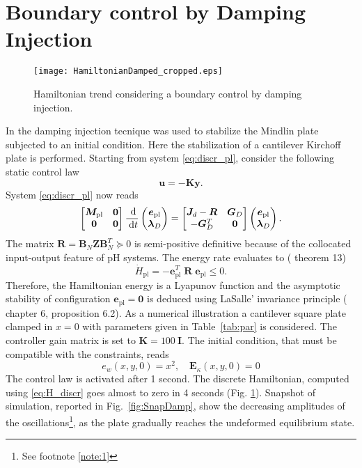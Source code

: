 \documentclass[letterpaper, 10 pt, conference]{ieeeconf}
\begin{document}
\section{Boundary control by Damping Injection}
\begin{figure}[t]
	\centering
	\texttt{[image: HamiltonianDamped\_cropped.eps]}
	\caption{Hamiltonian trend considering a boundary control by damping injection.}
	\label{fig:H_Damped}
\end{figure}
\label{sec:Damp}
In \cite{MacchelliMindlin} the damping injection tecnique was used to stabilize the Mindlin plate subjected to an initial condition. Here the stabilization of a cantilever Kirchoff plate is performed. Starting from system \eqref{eq:discr_pl}, consider the following static control law
\begin{equation}
\bm{u} = -\bm{K} \bm{y}.
\end{equation}
System \eqref{eq:discr_pl} now reads
\begin{equation}
\begin{bmatrix}
\bm{M}_{\text{pl}} & \bm{0} \\
\bm{0} & \bm{0} \\
\end{bmatrix}\frac{\d}{\d t}
\begin{pmatrix}
\bm{e}_{\text{pl}}\\
\bm{\lambda}_D \\
\end{pmatrix}
= \begin{bmatrix}
\bm{J}_d - \bm{R} & \bm{G}_D \\
-\bm{G}_D^T & \bm{0} \\
\end{bmatrix}
\begin{pmatrix}
\bm{e}_{\text{pl}}\\
\bm{\lambda}_D \\
\end{pmatrix}.
\end{equation}
The matrix $\bm{R} = \bm{B}_N \bm{Z} \bm{B}_N^T \succcurlyeq 0$ is semi-positive definitive because of the collocated input-output feature of pH systems. The energy rate evaluates to (\cite{beattie2018linear} theorem 13)
\[\dot{H} _{\text{pl}} = - \bm{e}_{\text{pl}}^T \; \bm{R} \; \bm{e}_{\text{pl}} \le 0. \]
Therefore, the Hamiltonian energy is a Lyapunov function and the asymptotic stability of configuration $\bm{e}_{\text{pl}} = \bm{0}$ is deduced using LaSalle' invariance  principle (\cite{bookPHs}  chapter 6, proposition 6.2). As a numerical illustration a cantilever square plate clamped in $x=0$ with parameters given in Table~\ref{tab:par} is considered. The controller gain matrix is set to $\bm{K} = 100 \ \bm{I}$. The initial condition, that must be compatible with the constraints, reads
\[e_w(x,y,0) = x^2, \quad \bm{E}_{\kappa}(x,y,0)=0\]
The control law is activated after 1 second. The discrete Hamiltonian, computed using \eqref{eq:H_discr} goes almost to zero in 4 seconds (Fig. \ref{fig:H_Damped}). Snapshot of simulation, reported in Fig.~\ref{fig:SnapDamp}, show the decreasing amplitudes of the oscillations\footnote{See footnote \ref{note:1}}, as the plate gradually reaches the undeformed equilibrium state.
\end{document}
